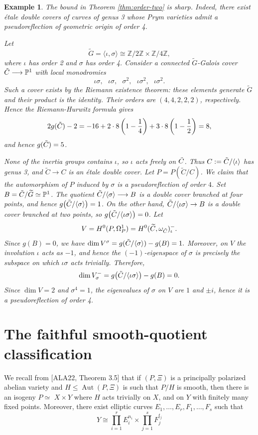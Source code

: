 \documentclass[10pt,a4paper]{amsart}
\newtheorem{exam}[thm]{Example}
\numberwithin{equation}{section}
\newcommand{\tC}{\Tilde{C}}
\begin{document}
\begin{exam}
\label{ex:order-four}
The bound in Theorem \ref{thm:order-two} is sharp. Indeed, there exist étale double covers of curves of genus 3 whose Prym varieties admit a pseudoreflection of geometric origin of order 4.

Let $$\widetilde G=\langle \iota,\sigma\rangle
\cong \mathbb Z/2\mathbb Z\times\mathbb Z/4\mathbb Z,$$
where $\iota$ has order 2 and $\sigma$ has order 4. Consider a connected $\widetilde G$-Galois cover $\tC\longrightarrow \mathbb{P}^1$ with local monodromies $$\iota\sigma,\ \ \ \iota\sigma,\ \ \ \sigma^2,\ \ \ \iota\sigma^2,\ \ \ \iota\sigma^2.$$
Such a cover exists by the Riemann existence theorem: these elements generate $\widetilde G$ and their product is the identity. Their orders are $(4,4,2,2,2)$, respectively. Hence the Riemann-Hurwitz formula gives
$$2g(\tC)-2 = -16+2\cdot 8\left(1-\frac14\right)+3\cdot 8\left(1-\frac12\right)=8,$$ and hence $g(\tC)=5$.

None of the inertia groups contains $\iota$, so $\iota$ acts freely on $\tC$. Thus $C:=\tC/\langle\iota\rangle$
has genus 3, and $\widetilde C\to C$ is an étale double cover. Let $P=P(\widetilde C/C)$. We claim that the automorphism of $P$ induced by $\sigma$ is a pseudoreflection of order $4$. Set $B=\tC/\widetilde G\simeq\mathbb P^1$. The quotient $\tC/\langle\sigma\rangle\longrightarrow B$
is a double cover branched at four points, and hence $g\bigl(\tC/\langle\sigma\rangle\bigr)=1$. On the other hand, $\tC/\langle\iota\sigma\rangle\to B$
is a double cover branched at two points, so
$g\bigl(\tC/\langle\iota\sigma\rangle\bigr)=0$. Let $$V=H^0(P,\Omega_P^1)=H^0(\widetilde C,\omega_{\tC})^{-}_{\iota}.$$
Since $g(B)=0$, we have $\dim V^{\sigma}= g(\tC/\langle \sigma \rangle) - g(B) =1.$
Moreover, on $V$ the involution $\iota$ acts as $-1$, and hence the $(-1)$-eigenspace of $\sigma$ is precisely the subspace on which $\iota\sigma$ acts trivially. Therefore, $$\dim V^{-}_{\sigma}=g\bigl(\tC/\langle\iota\sigma\rangle\bigr)-g(B)=0.$$
Since $\dim V=2$ and $\sigma^4=1$, the eigenvalues of $\sigma$ on $V$ are $1$ and $\pm i$, hence it is a pseudoreflection of order 4.
\end{exam}


\section{The faithful smooth-quotient classification}\label{sec:groups}

We recall from [ALA22, Theorem 3.5] that if \((P, \Xi)\) is a principally polarized abelian variety and \(H \leq \operatorname{Aut}(P, \Xi)\) is such that \(P / H\) is smooth, then there is an isogeny \(P \simeq\) \(X \times Y\) where \(H\) acts trivially on \(X\), and on \(Y\) with finitely many fixed points. Moreover, there exist elliptic curves \(E_1, \ldots, E_r, F_1, \ldots, F_s\) such that
\[
Y \cong \prod_{i=1}^r E_i^{n_i} \times \prod_{j=1}^s F_j^{t_j}
\]
\end{document}
